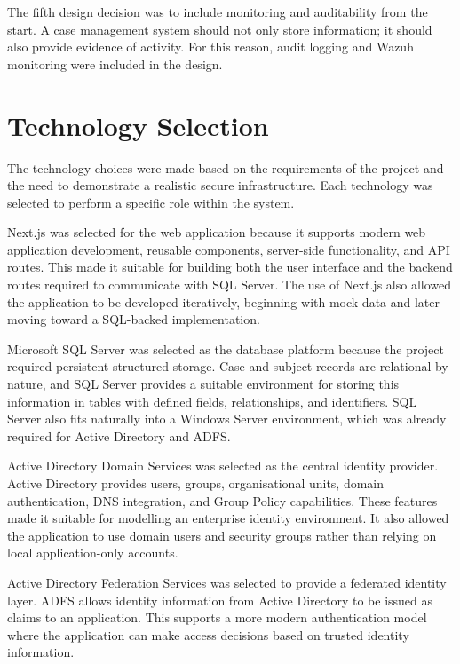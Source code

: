 The fifth design decision was to include monitoring and auditability from the start. A case management system should not only store information; it should also provide evidence of activity. For this reason, audit logging and Wazuh monitoring were included in the design.


\section{Technology Selection}

The technology choices were made based on the requirements of the project and the need to demonstrate a realistic secure infrastructure. Each technology was selected to perform a specific role within the system.

Next.js was selected for the web application because it supports modern web application development, reusable components, server-side functionality, and API routes. This made it suitable for building both the user interface and the backend routes required to communicate with SQL Server. The use of Next.js also allowed the application to be developed iteratively, beginning with mock data and later moving toward a SQL-backed implementation.

Microsoft SQL Server was selected as the database platform because the project required persistent structured storage. Case and subject records are relational by nature, and SQL Server provides a suitable environment for storing this information in tables with defined fields, relationships, and identifiers. SQL Server also fits naturally into a Windows Server environment, which was already required for Active Directory and ADFS.

Active Directory Domain Services was selected as the central identity provider. Active Directory provides users, groups, organisational units, domain authentication, DNS integration, and Group Policy capabilities. These features made it suitable for modelling an enterprise identity environment. It also allowed the application to use domain users and security groups rather than relying on local application-only accounts.

Active Directory Federation Services was selected to provide a federated identity layer. ADFS allows identity information from Active Directory to be issued as claims to an application. This supports a more modern authentication model where the application can make access decisions based on trusted identity information.

